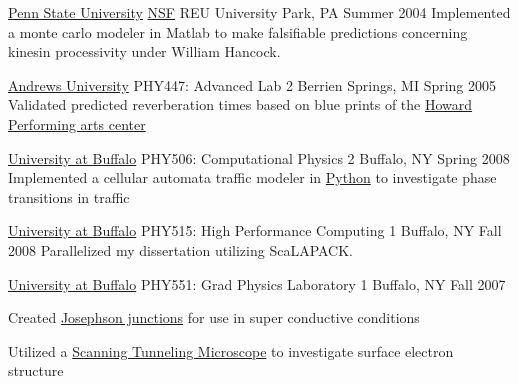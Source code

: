

\begin{cventries}
  


  \cventry
    {{\href{www.psu.edu}{Penn State University}}}
    {\href{www.nsf.gov}{NSF} REU}
    {University Park, PA}
    {Summer 2004}
    {Implemented a monte carlo modeler in Matlab to make falsifiable predictions concerning kinesin processivity under William Hancock.}

  \cventry
    {\href{www.andrews.edu}{Andrews University}}
    {PHY447: Advanced Lab 2}
    {Berrien Springs, MI} {Spring 2005} %
    {Validated predicted reverberation times based on blue prints of the \href{howard.andrews.edu}{Howard Performing arts center}}


  \cventry
    {\href{www.buffalo.edu}{University at Buffalo}}
    {PHY506: Computational Physics 2}
    {Buffalo, NY} {Spring 2008}
    {Implemented a cellular automata traffic modeler in \href{www.python.org}{Python} to investigate phase transitions in traffic}


  \cventry
    {\href{www.buffalo.edu}{University at Buffalo}}
	{PHY515: High Performance Computing 1}
    {Buffalo, NY} {Fall 2008}
    {Parallelized my dissertation utilizing ScaLAPACK.}

  \cventry
    {\href{www.buffalo.edu}{University at Buffalo}}
  	{PHY551: Grad Physics Laboratory 1}
    {Buffalo, NY} {Fall 2007}
    {
    \begin{cvitems}
        \item {Created \href{https://en.wikipedia.org/wiki/Josephson_effect}{Josephson junctions} for use in super conductive conditions}
        \item {Utilized a \href{https://en.wikipedia.org/wiki/Scanning_tunneling_microscope}{Scanning Tunneling Microscope} to investigate surface electron structure}
    \end{cvitems}
    }


\end{cventries}
